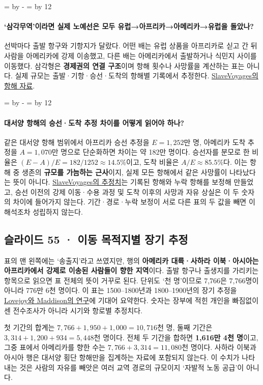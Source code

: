 \documentclass[10pt,a4paper]{article}
\newcommand{\ReserveQuestionSpace}{%
  \par\begingroup
  \dimen0=\pagegoal \advance\dimen0 by -\pagetotal
  \dimen2=\baselineskip \multiply\dimen2 by 12
  \ifdim\dimen0<\dimen2 \newpage\fi
  \endgroup}
\begin{document}
\ReserveQuestionSpace
\paragraph{‘삼각무역’이라면 실제 노예선은 모두 유럽→아프리카→아메리카→유럽을 돌았나?}
선박마다 출발 항구와 기항지가 달랐다. 어떤 배는 유럽 상품을 아프리카로 싣고 간 뒤 사람을 아메리카에 강제 이송했고, 다른 배는 아메리카에서 출발하거나 식민지 사이를 이동했다. 삼각형은 \textbf{경제권의 연결 구조}이며 항해 횟수나 사망률을 계산하는 표는 아니다. 실제 규모는 출발·기항·승선·도착의 항해별 기록에서 추정한다. \href{https://legacy.slavevoyages.org/blog/methodology-trans-atlantic}{SlaveVoyages의 항해 자료}.\par

\ReserveQuestionSpace
\paragraph{대서양 항해의 승선·도착 추정 차이를 어떻게 읽어야 하나?}
같은 대서양 항해 범위에서 아프리카 승선 추정을 $E=1{,}252$만 명, 아메리카 도착 추정을 $A=1{,}070$만 명으로 단순화하면 차이는 약 182만 명이다. 승선자를 분모로 한 비율은 $(E-A)/E=182/1252\approx14.5\%$이고, 도착 비율은 $A/E\approx85.5\%$다. 이는 항해 중 생존의 \textbf{규모를 가늠하는 근사}이지, 실제 모든 항해에서 같은 사망률이 나타났다는 뜻이 아니다. \href{https://www.slavevoyages.org/assessment/estimates}{SlaveVoyages의 추정치}는 기록된 항해와 누락 항해를 보정해 만들었고, 승선 이전의 강제 이동·수용 과정 및 도착 이후의 사망과 자유 상실은 이 두 숫자의 차이에 들어가지 않는다. 기간·경로·누락 보정이 서로 다른 표의 두 값을 빼면 이 해석조차 성립하지 않는다.\par

\subsection{슬라이드 55 · 이동 목적지별 장기 추정}
표의 맨 왼쪽에는 ‘송출지’라고 쓰였지만, 행의 \textbf{아메리카 대륙·사하라 이북·아시아는 아프리카에서 강제로 이송된 사람들이 향한 지역}이다. 출발 항구나 출생지를 가리키는 항목으로 읽으면 표 전체의 뜻이 거꾸로 된다. 단위도 ‘천 명’이므로 7,766은 7,766명이 아니라 776만 6천 명이다. 이 표는 1500–1800년과 1800–1900년의 장기 추정을 \href{https://academic.oup.com/book/52182}{Lovejoy와 Maddison의 연구}에 기대어 요약한다. 숫자는 장부에 적힌 개인을 빠짐없이 센 전수조사가 아니라 시기와 항로별 추정치다.\par

첫 기간의 합계는 $7{,}766+1{,}950+1{,}000=10{,}716$천 명, 둘째 기간은 $3{,}314+1{,}200+934=5{,}448$천 명이다. 전체 두 기간을 합하면 \textbf{1,616만 4천 명}이고, 그중 표에서 아메리카를 향한 수는 $7{,}766+3{,}314=11{,}080$천 명이다. 사하라 이북과 아시아 행은 대서양 횡단 항해만을 집계하는 자료에 포함되지 않는다. 이 수치가 나타내는 것은 사람의 자유를 빼앗은 여러 교역 경로의 규모이지 ‘자발적 노동 공급’이 아니다.\par
\end{document}
